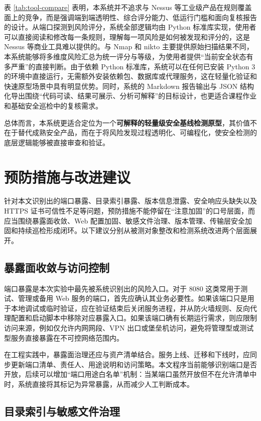 \documentclass[12pt,a4paper,fontset=none]{ctexart}
\begin{document}
表 \ref{tab:tool-compare} 表明，本系统并不追求与 Nessus 等工业级产品在规则覆盖面上的竞争，而是强调端到端透明性、综合评分能力、低运行门槛和面向复核报告的设计。从端口探测到风险评分，系统全部逻辑均由 Python 标准库实现，使用者可以直接阅读和修改每一条规则，理解每一项风险是如何被发现和评分的，这是 Nessus 等商业工具难以提供的。与 Nmap 和 nikto 主要提供原始扫描结果不同，本系统能够将多维度风险汇总为统一评分与等级，为使用者提供“当前安全状态有多严重”的直接判断。由于依赖 Python 标准库，系统可以在任何已安装 Python 3 的环境中直接运行，无需额外安装依赖包、数据库或代理服务，这在轻量化验证和快速原型场景中具有明显优势。同时，系统的 Markdown 报告输出与 JSON 结构化导出围绕“代码可读、结果可展示、分析可解释”的目标设计，也更适合课程作业和基础安全巡检中的复核需求。

总体而言，本系统更适合定位为一个\textbf{可解释的轻量级安全基线检测原型}，其价值不在于替代成熟安全产品，而在于将风险发现过程透明化、可编程化，使安全检测的底层逻辑能够被直接审查和验证。

\section{预防措施与改进建议}

针对本文识别出的端口暴露、目录索引暴露、版本信息泄露、安全响应头缺失以及 HTTPS 证书可信性不足等问题，预防措施不能停留在“注意加固”的口号层面，而应当围绕暴露面收敛、Web 配置加固、敏感文件治理、版本管理、传输层安全加固和持续巡检形成闭环。以下建议分别从被测对象整改和检测系统改进两个层面展开。

\subsection{暴露面收敛与访问控制}

端口暴露是本次实验中最先被系统识别出的风险入口。对于 8080 这类常用于测试、管理或备用 Web 服务的端口，首先应确认其业务必要性。如果该端口只是用于本地调试或临时验证，应在验证结束后关闭服务进程，并从防火墙规则、反向代理配置和启动脚本中移除对应暴露入口。如果该端口确有长期运行需求，则应限制访问来源，例如仅允许内网网段、VPN 出口或堡垒机访问，避免将管理型或测试型服务直接暴露在不可控网络范围内。

在工程实践中，暴露面治理还应与资产清单结合。服务上线、迁移和下线时，应同步更新端口清单、责任人、用途说明和访问策略。本文程序当前能够识别端口是否开放，后续可以增加“端口用途白名单”机制：当某端口虽然开放但不在允许清单中时，系统直接将其标记为异常暴露，从而减少人工判断成本。

\subsection{目录索引与敏感文件治理}
\end{document}
